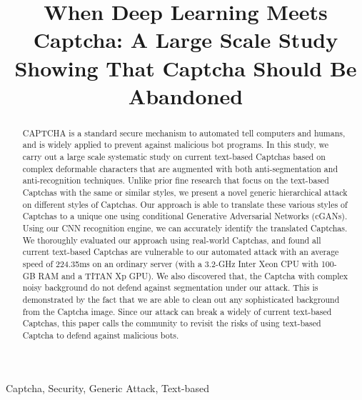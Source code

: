 \documentclass[10pt,conference]{IEEEtran}
\begin{document}

\title{When Deep Learning Meets Captcha: A Large Scale Study Showing That Captcha Should Be Abandoned}
\author{
}

\IEEEoverridecommandlockouts \makeatletter{}\makeatother \IEEEpubid{\parbox{\columnwidth}{ }
\hspace{\columnsep}\makebox[\columnwidth]{}}

\maketitle

\begin{abstract}
CAPTCHA is a standard secure mechanism to automated tell computers and humans, and is widely applied to prevent against malicious bot programs. In this study, we carry out a large scale systematic study on current text-based Captchas based on complex deformable characters that are augmented with both anti-segmentation and anti-recognition techniques. Unlike prior fine research that focus on the text-based Captchas with the same or similar styles, we present a novel generic hierarchical attack on different styles of Captchas. Our approach is able to translate these various styles of Captchas to a unique one using conditional Generative Adversarial Networks (cGANs). Using our CNN recognition engine, we can accurately identify the translated Captchas. We thoroughly evaluated our approach using real-world Captchas, and found all current text-based Captchas are vulnerable to our automated attack with an average speed of 224.35ms on an ordinary server (with a 3.2-GHz Inter Xeon CPU with 100-GB RAM and a TITAN Xp GPU). We also discovered that, the Captcha with complex noisy background do not defend against segmentation under our attack. This is demonstrated by the fact that we are able to clean out any sophisticated background from the Captcha image. Since our attack can break a widely of current text-based Captchas, this paper calls the community to revisit the risks of using text-based Captcha to defend against malicious bots.
\end{abstract}

\begin{IEEEkeywords}
    Captcha, Security, Generic Attack, Text-based
\end{IEEEkeywords}




%






%
%
\end{document}
